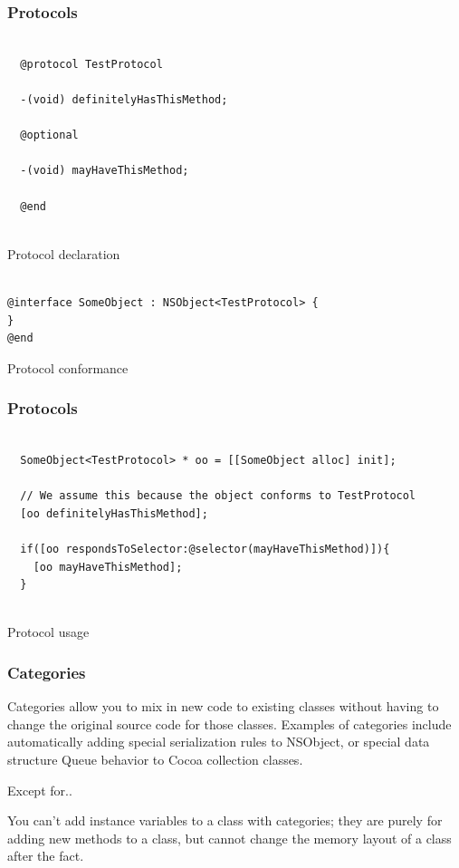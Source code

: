 \documentclass[10pt]{beamer}
\begin{document}
\begin{frame}[fragile]
  \frametitle{Protocols}
  \begin{listing}[H]
    \begin{verbatim}
  
  @protocol TestProtocol
  
  -(void) definitelyHasThisMethod;
  
  @optional
  
  -(void) mayHaveThisMethod;
  
  @end
              
  \end{verbatim}
    \caption{Protocol declaration}
    \label{listing:15}
  \end{listing}
\begin{listing}[H]
  \begin{verbatim}

@interface SomeObject : NSObject<TestProtocol> {
}
@end 
\end{verbatim}
  \caption{Protocol conformance}
  \label{listing:16}
\end{listing}

\end{frame}

\begin{frame}[fragile]
  \frametitle{Protocols}
  \begin{listing}[H]
    \begin{verbatim}
  
  SomeObject<TestProtocol> * oo = [[SomeObject alloc] init];
  
  // We assume this because the object conforms to TestProtocol              
  [oo definitelyHasThisMethod];
  
  if([oo respondsToSelector:@selector(mayHaveThisMethod)]){
    [oo mayHaveThisMethod];
  }
              
  \end{verbatim}
    \caption{Protocol usage}
    \label{listing:17}
  \end{listing}

\end{frame}

    
\begin{frame}[fragile]
  \frametitle{Categories}
  Categories allow you to mix in new code to existing classes without having to change the original source code for those classes.  Examples of categories include automatically adding special serialization rules to NSObject, or special data structure Queue behavior to Cocoa collection classes.
\begin{alertblock}{Except for..}
  
  You can't add instance variables to a class with categories; they are
  purely for adding new methods to a class, but cannot change the memory
  layout of a class after the fact.
              
  \end{alertblock}

\end{frame}
\end{document}
